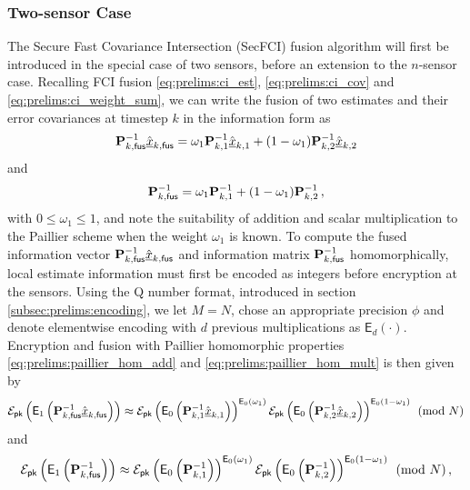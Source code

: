 \subsubsection{Two-sensor Case}\label{subsubsec:cloud_fusion:secfci_2sen}
The Secure Fast Covariance Intersection (SecFCI) fusion algorithm will first be introduced in the special case of two sensors, before an extension to the $n$-sensor case. Recalling FCI fusion \eqref{eq:prelims:ci_est}, \eqref{eq:prelims:ci_cov} and \eqref{eq:prelims:ci_weight_sum}, we can write the fusion of two estimates and their error covariances at timestep $k$ in the information form as
\begin{equation}
    {\ensuremath{{\mathbf{P}}}}_{k,\mathsf{fus}}^{-1}\hat{{\underline{x}}}_{k,\mathsf{fus}} = \omega_1{{\mathbf{P}}}_{k,1}^{-1}\hat{{\underline{x}}}_{k,1} + (1 - \omega_1){{\mathbf{P}}}_{k,2}^{-1}\hat{{\underline{x}}}_{k,2}
\end{equation}
and
\begin{equation}
    {\ensuremath{{\mathbf{P}}}}_{k,\mathsf{fus}}^{-1} = \omega_1{{\mathbf{P}}}_{k,1}^{-1} + (1 - \omega_1){{\mathbf{P}}}_{k,2}^{-1}\,,
\end{equation}
with $0\leq \omega_1\leq 1$, and note the suitability of addition and scalar multiplication to the Paillier scheme when the weight $\omega_1$ is known. To compute the fused information vector ${{\mathbf{P}}}_{k,\mathsf{fus}}^{-1}\hat{{\underline{x}}}_{k,\mathsf{fus}}$ and information matrix ${{\mathbf{P}}}_{k,\mathsf{fus}}^{-1}$ homomorphically, local estimate information must first be encoded as integers before encryption at the sensors. Using the Q number format, introduced in section \ref{subsec:prelims:encoding}, we let $M=N$, chose an appropriate precision $\phi$ and denote elementwise encoding with $d$ previous multiplications as $\mathsf{E}_d(\cdot)$. Encryption and fusion with Paillier homomorphic properties \eqref{eq:prelims:paillier_hom_add} and \eqref{eq:prelims:paillier_hom_mult} is then given by
\begin{equation}\label{eq:cloud_fusion:secfci_2sen_paillier_fuse_ests}
    \mathcal{E}_{\mathsf{pk}}\left(\mathsf{E}_1\left({{\mathbf{P}}}_{k,\mathsf{fus}}^{-1}\hat{{\underline{x}}}_{k,\mathsf{fus}}\right)\right) \approx \mathcal{E}_{\mathsf{pk}}\left(\mathsf{E}_0\left({{\mathbf{P}}}^{-1}_{k,1}\hat{{\underline{x}}}_{k,1}\right)\right)^{\mathsf{E}_0(\omega_1)}\mathcal{E}_{\mathsf{pk}}\left(\mathsf{E}_0\left({{\mathbf{P}}}^{-1}_{k,2}\hat{{\underline{x}}}_{k,2}\right)\right)^{\mathsf{E}_0(1 - \omega_1)}\pmod{N}
\end{equation}
and
\begin{equation}\label{eq:cloud_fusion:secfci_2sen_paillier_fuse_covs}
    \mathcal{E}_{\mathsf{pk}}\left(\mathsf{E}_1\left({{\mathbf{P}}}_{k,\mathsf{fus}}^{-1}\right)\right) \approx \mathcal{E}_{\mathsf{pk}}\left(\mathsf{E}_0\left({{\mathbf{P}}}^{-1}_{k,1}\right)\right)^{\mathsf{E}_0(\omega_1)}\mathcal{E}_{\mathsf{pk}}\left(\mathsf{E}_0\left({{\mathbf{P}}}^{-1}_{k,2}\right)\right)^{\mathsf{E}_0(1 -\omega_1)}\pmod{N}\,,
\end{equation}
